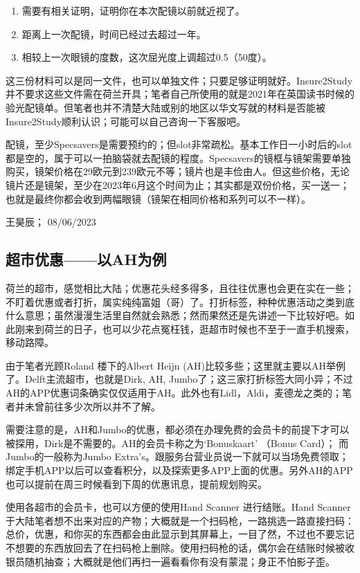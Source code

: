 \begin{enumerate}
\item 需要有相关证明，证明你在本次配镜以前就近视了。
\item 距离上一次配镜，时间已经过去超过一年。
\item 相较上一次眼镜的度数，这次屈光度上调超过0.5（50度）。
\end{enumerate}

这三份材料可以是同一文件，也可以单独文件；只要足够证明就好。Insure2Study并不要求这些文件需在荷兰开具；笔者自己所使用的就是2021年在英国读书时候的验光配镜单。但笔者也并不清楚大陆或别的地区以华文写就的材料是否能被Insure2Study顺利认识；可能可以自己咨询一下客服吧。

配镜，至少Specsavers是需要预约的；但slot非常疏松。基本工作日一小时后的slot都是空的，属于可以一拍脑袋就去配镜的程度。Specsavers的镜框与镜架需要单独购买，镜架价格在29欧元到239欧元不等；镜片也是丰俭由人。但这些价格，无论镜片还是镜架，至少在2023年6月这个时间为止；其实都是双份价格，买一送一；也就是最终你都会收到两幅眼镜（镜架在相同价格和系列可以不一样）。
\begin{flushright}
王昊辰； 08/06/2023
\end{flushright}

\subsection{超市优惠——以AH为例}
荷兰的超市，感觉相比大陆；优惠花头经多得多，且往往优惠也会更在实在一些；不盯着优惠或者打折，属实纯纯富姐（哥）了。打折标签，种种优惠活动之类到底什么意思；虽然漫漫生活里自然就会熟悉；然而果然还是先讲述一下比较好吧。如此刚来到荷兰的日子，也可以少花点冤枉钱，逛超市时候也不至于一直手机搜索，移动路障。

由于笔者光顾Roland 楼下的Albert Heijn (AH)比较多些；这里就主要以AH举例了。Delft主流超市，也就是Dirk, AH, Jumbo了；这三家打折标签大同小异；不过AH的APP优惠词条确实仅仅适用于AH。此外也有Lidl，Aldi，麦德龙之类的；笔者并未曾前往多少次所以并不了解。

需要注意的是，AH和Jumbo的优惠，都必须在办理免费的会员卡的前提下才可以被探用，Dirk是不需要的。AH的会员卡称之为‘Bonuskaart’ （Bonus Card）； 而Jumbo的一般称为Jumbo Extra's。跟服务台营业员说一下就可以当场免费领取；绑定手机APP以后可以查看积分，以及探索更多APP上面的优惠。另外AH的APP也可以提前在周三时候看到下周的优惠讯息，提前规划购买。

使用各超市的会员卡，也可以方便的使用Hand Scanner 进行结账。Hand Scanner于大陆笔者想不出来对应的产物；大概就是一个扫码枪，一路挑选一路直接扫码：总价，优惠，和你买的东西都会由此显示到其屏幕上，一目了然，不过也不要忘记不想要的东西放回去了在扫码枪上删除。使用扫码枪的话，偶尔会在结账时候被收银员随机抽查；大概就是他们再扫一遍看看你有没有蒙混；身正不怕影子歪。

